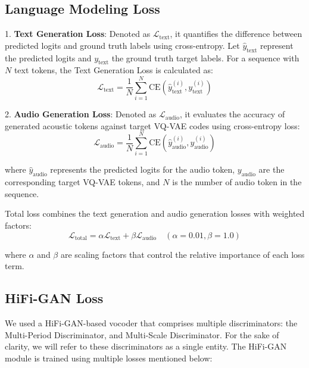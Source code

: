 \subsection{Language Modeling Loss}
1. \textbf{Text Generation Loss}: Denoted as $\mathcal{L}_{\text{text}}$, it quantifies the difference between predicted logits and ground truth labels using cross-entropy. Let $\hat{y}_{\text{text}}$ represent the predicted logits and $y_{\text{text}}$ the ground truth target labels. For a sequence with $N$ text tokens, the Text Generation Loss is calculated as: 
   \begin{equation}
   \mathcal{L}_{\text{text}} = \frac{1}{N} \sum_{i=1}^{N} \text{CE}(\hat{y}_{\text{text}}^{(i)}, y_{\text{text}}^{(i)})
   \end{equation}
   
2. \textbf{Audio Generation Loss}: Denoted as $\mathcal{L}_{\text{audio}}$, it evaluates the accuracy of generated acoustic tokens against target VQ-VAE codes using cross-entropy loss:
   \begin{equation}
   \mathcal{L}_{\text{audio}} = \frac{1}{N} \sum_{i=1}^{N} \text{CE}(\hat{y}_{\text{audio}}^{(i)}, y_{\text{audio}}^{(i)})
   \end{equation}

where $\hat{y}_{\text{audio}}$ represents the predicted logits for the audio token, $y_{\text{audio}}$ are the corresponding target VQ-VAE tokens, and $N$ is the number of audio token in the sequence.
   
Total loss combines the text generation and audio generation losses with weighted factors:
   \begin{equation}
   \mathcal{L}_{\text{total}} = \alpha \mathcal{L}_{\text{text}} + \beta \mathcal{L}_{\text{audio}} \quad (\alpha = 0.01, \beta = 1.0)
   \end{equation}

where $\alpha$ and $\beta$ are scaling factors that control the relative importance of each loss term.




\subsection{HiFi-GAN Loss}
We used a HiFi-GAN-based vocoder \cite{kong2020hifi} that comprises multiple discriminators: the Multi-Period Discriminator, and Multi-Scale Discriminator. For the sake of clarity, we will refer to these discriminators as a single entity. The HiFi-GAN module is trained using multiple losses mentioned below:

